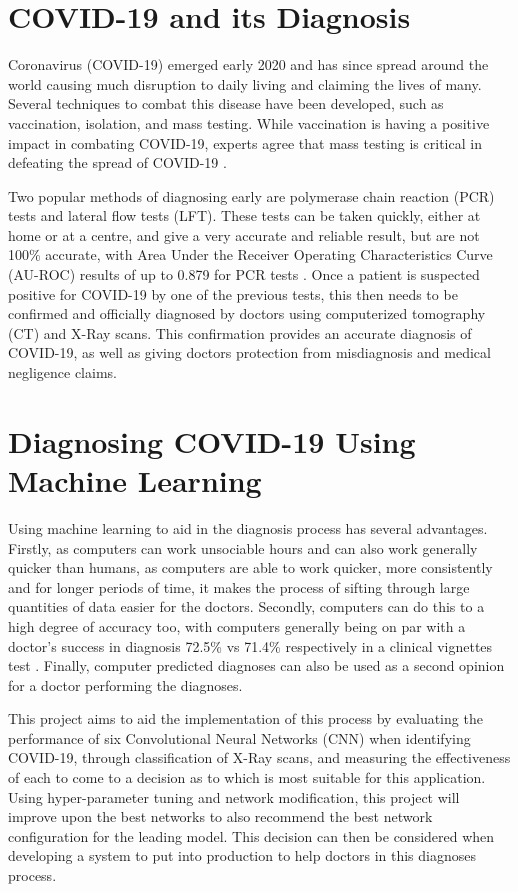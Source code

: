 \section{COVID-19 and its Diagnosis}
Coronavirus (COVID-19) emerged early 2020 and has since spread around the world causing much disruption to daily living and claiming the lives of many. Several techniques to combat this disease have been developed, such as vaccination, isolation, and mass testing. While vaccination is having a positive impact in combating COVID-19, experts agree that mass testing is critical in defeating the spread of COVID-19 \citep{rosenthal2020importance}.

Two popular methods of diagnosing early are polymerase chain reaction (PCR) tests and lateral flow tests (LFT). These tests can be taken quickly, either at home or at a centre, and give a very accurate and reliable result, but are not 100\% accurate, with Area Under the Receiver Operating Characteristics Curve (AU-ROC) results of up to 0.879 for PCR tests \citep{mardani2020laboratory}. Once a patient is suspected positive for COVID-19 by one of the previous tests, this then needs to be confirmed and officially diagnosed by doctors using computerized tomography (CT) and X-Ray scans. This confirmation provides an accurate diagnosis of COVID-19, as well as giving doctors protection from misdiagnosis and medical negligence claims.

\section{Diagnosing COVID-19 Using Machine Learning}
Using machine learning to aid in the diagnosis process has several advantages. Firstly, as computers can work unsociable hours and can also work generally quicker than humans, as computers are able to work quicker, more consistently and for longer periods of time, it makes the process of sifting through large quantities of data easier for the doctors. Secondly, computers can do this to a high degree of accuracy too, with computers generally being on par with a doctor’s success in diagnosis 72.5\% vs 71.4\% respectively in a clinical vignettes test \citep{richens2020improving}. Finally, computer predicted diagnoses can also be used as a second opinion for a doctor performing the diagnoses. 

This project aims to aid the implementation of this process by evaluating the performance of six Convolutional Neural Networks (CNN) when identifying COVID-19, through classification of X-Ray scans, and measuring the effectiveness of each to come to a decision as to which is most suitable for this application. Using hyper-parameter tuning and network modification, this project will improve upon the best networks to also recommend the best network configuration for the leading model. This decision can then be considered when developing a system to put into production to help doctors in this diagnoses process.